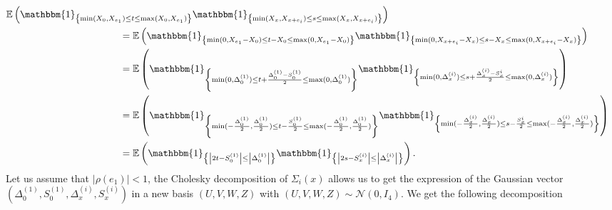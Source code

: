 \documentclass[12pt]{article}
\theoremstyle{Theorem}
\begin{document}
{\small
\begin{align*}
\mathbb{E}\left(\mathbbm{1}_{\left\{\min(X_{\scriptscriptstyle 0}, X_{e_1}) \leq t \leq \max(X_{\scriptscriptstyle 0}, X_{e_1})\right\}}\mathbbm{1}_{\left\{\min(X_{\scriptscriptstyle x}, X_{x+e_i}) \leq s \leq \max(X_{\scriptscriptstyle x}, X_{x+e_i}) \right\}}\right) \\
& \hspace{-9.75cm}= \mathbb{E}\left(\mathbbm{1}_{\left\{\min(0, X_{e_1} -X_{\scriptscriptstyle 0}) \leq t -X_{\scriptscriptstyle 0}\leq \max(0, X_{e_1}-X_{\scriptscriptstyle 0})\right\}}\mathbbm{1}_{\left\{\min(0, X_{x+e_i}-X_{\scriptscriptstyle x}) \leq s - X_{\scriptscriptstyle x} \leq \max(0, X_{x+e_i} - X_{\scriptscriptstyle x}) \right\}}\right) \\
& \hspace{-9.75cm}= \mathbb{E}\left(\mathbbm{1}_{\left\{\min(0, \Delta^{\scriptscriptstyle (1)}_{\scriptscriptstyle 0}) \leq t + \frac{\Delta^{\scriptscriptstyle (1)}_{\scriptscriptstyle 0} - S^{\scriptscriptstyle (1)}_{\scriptscriptstyle 0}}{2}\leq \max(0, \Delta^{\scriptscriptstyle (1)}_{\scriptscriptstyle 0})\right\}}\mathbbm{1}_{\left\{\min(0, \Delta^{\scriptscriptstyle (i)}_{\scriptscriptstyle x}) \leq s + \frac{\Delta^{\scriptscriptstyle (i)}_{\scriptscriptstyle x} - S^{i}_{\scriptscriptstyle x}}{2} \leq \max(0, \Delta^{\scriptscriptstyle (i)}_{\scriptscriptstyle x}) \right\}}\right) \\
& \hspace{-9.75cm}= \mathbb{E}\left(\mathbbm{1}_{\left\{\min(-\frac{\Delta^{\scriptscriptstyle (1)}_{\scriptscriptstyle 0}}{2}, \frac{\Delta^{\scriptscriptstyle (1)}_{\scriptscriptstyle 0}}{2}) \leq t - \frac{S^{\scriptscriptstyle (1)}_{\scriptscriptstyle 0}}{2}\leq \max(-\frac{\Delta^{\scriptscriptstyle (1)}_{\scriptscriptstyle 0}}{2}, \frac{\Delta^{\scriptscriptstyle (1)}_{\scriptscriptstyle 0}}{2})\right\}}\mathbbm{1}_{\left\{\min(-\frac{\Delta^{\scriptscriptstyle (i)}_{\scriptscriptstyle x}}{2}, \frac{\Delta^{\scriptscriptstyle (i)}_{\scriptscriptstyle x}}{2}) \leq s - \frac{S^{i}_{\scriptscriptstyle x}}{2} \leq \max(-\frac{\Delta^{\scriptscriptstyle (i)}_{\scriptscriptstyle x}}{2},\frac{\Delta^{\scriptscriptstyle (i)}_{\scriptscriptstyle x}}{2}) \right\}}\right) \\
& \hspace{-9.75cm}= \mathbb{E}\left(\mathbbm{1}_{\left\{ \left|2t - S^{\scriptscriptstyle (1)}_{\scriptscriptstyle 0}\right| \leq \left|\Delta^{\scriptscriptstyle (1)}_{\scriptscriptstyle 0}\right|\right\}}\mathbbm{1}_{\left\{ \left|2s - S^{\scriptscriptstyle (i)}_{\scriptscriptstyle x}\right| \leq \left|\Delta^{\scriptscriptstyle (i)}_x\right| \right\}}\right).
\end{align*}}Let us assume that $|\rho(e_1)| < 1$, the Cholesky decomposition of $\Sigma_{i}(x)$ allows us to get the expression of the Gaussian vector $\left(\Delta^{\scriptscriptstyle (1)}_{\scriptscriptstyle 0},S^{\scriptscriptstyle (1)}_{\scriptscriptstyle 0},\Delta^{\scriptscriptstyle (i)}_{\scriptscriptstyle x},S^{\scriptscriptstyle (i)}_{\scriptscriptstyle x} \right)$ in a new basis $\left(U,V,W,Z\right)$ with $\left(U, V, W, Z\right) \sim \mathcal{N}\left(0,I_{4}\right)$. We get the following decomposition \\ 
\end{document}
